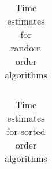 \documentclass[letterpaper,luatex,11pt]{article}
\begin{document}
\begin{table}
    \begin{tabular}{ lr }
        
    \end{tabular}
    \caption{Time estimates for random order algorithms}\label{randomtable}
\end{table}

\begin{table}
    \begin{tabular}{ lr } 
        
    \end{tabular}
    \caption{Time estimates for sorted order algorithms}\label{sortedtable}
\end{table}

\printbibliography
\end{document}
